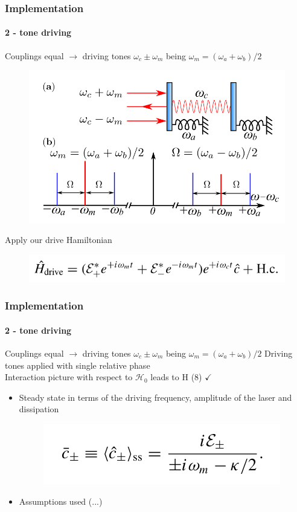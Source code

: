 \documentclass[aspectratio=43]{beamer}
\begin{document}
\begin{frame}

	\frametitle{Implementation}
	\framesubtitle{2 - tone driving}
	
	Couplings equal $\longrightarrow$ driving tones $\omega_{c} \pm \omega_{m}$ being  $\omega_{m} = (\omega_{a} + \omega_{b}) / 2$
	
	\begin{figure}
		\includegraphics[width = 7 cm]{plots/plot_2_tone.png}
	\end{figure}	

	Apply our drive Hamiltonian

	\begin{figure}
		\includegraphics[width = 7 cm]{plots/hamiltonian_2_tone.png}
	\end{figure}

\end{frame}

\begin{frame}
	
	\frametitle{Implementation}
	\framesubtitle{2 - tone driving}
	
	Couplings equal $\longrightarrow$ driving tones $\omega_{c} \pm \omega_{m}$ being  $\omega_{m} = (\omega_{a} + \omega_{b}) / 2$
	Driving tones applied with single relative phase\\
	Interaction picture with respect to $\mathcal{H}_{0}$ leads to H (8) $\checkmark$\\
	
	\begin{itemize}
		\item Steady state in terms of the driving frequency, amplitude of the laser and dissipation
		\begin{figure}
			\includegraphics[width = 5 cm]{plots/ss_2_tone.png}
		\end{figure}
		\item Assumptions used (...)
	\end{itemize}

\end{frame}
\end{document}
